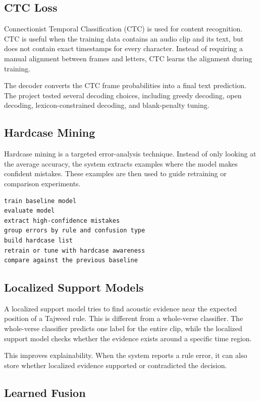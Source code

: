 \subsection{CTC Loss}

Connectionist Temporal Classification (CTC) is used for content recognition.
CTC is useful when the training data contains an audio clip and its text, but
does not contain exact timestamps for every character. Instead of requiring a
manual alignment between frames and letters, CTC learns the alignment during
training.

The decoder converts the CTC frame probabilities into a final text prediction.
The project tested several decoding choices, including greedy decoding,
open decoding, lexicon-constrained decoding, and blank-penalty tuning.

\subsection{Hardcase Mining}

Hardcase mining is a targeted error-analysis technique. Instead of only looking
at the average accuracy, the system extracts examples where the model makes
confident mistakes. These examples are then used to guide retraining or
comparison experiments.

\begin{lstlisting}[caption={Hardcase mining loop.},label={lst:hardcase_loop}]
train baseline model
evaluate model
extract high-confidence mistakes
group errors by rule and confusion type
build hardcase list
retrain or tune with hardcase awareness
compare against the previous baseline
\end{lstlisting}

\subsection{Localized Support Models}

A localized support model tries to find acoustic evidence near the expected
position of a Tajweed rule. This is different from a whole-verse classifier.
The whole-verse classifier predicts one label for the entire clip, while the
localized support model checks whether the evidence exists around a specific
time region.

This improves explainability. When the system reports a rule error, it can also
store whether localized evidence supported or contradicted the decision.

\subsection{Learned Fusion}

